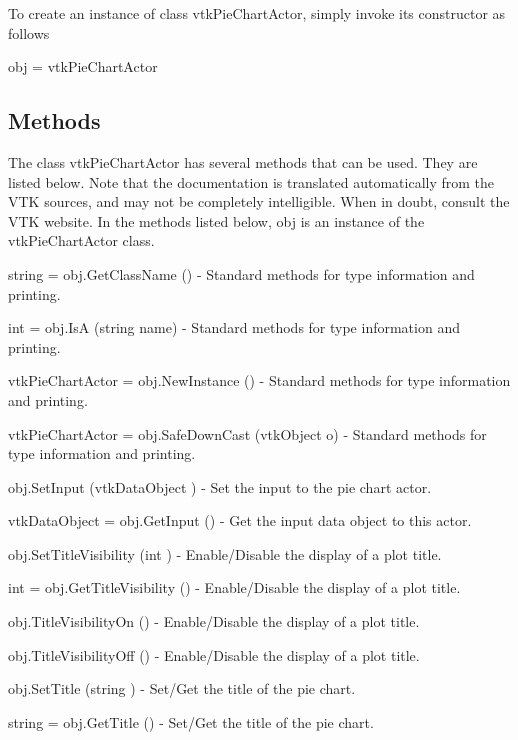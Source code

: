 To create an instance of class vtk\-Pie\-Chart\-Actor, simply invoke its constructor as follows \begin{DoxyVerb}  obj = vtkPieChartActor
\end{DoxyVerb}
 \hypertarget{vtkwidgets_vtkxyplotwidget_Methods}{}\subsection{Methods}\label{vtkwidgets_vtkxyplotwidget_Methods}
The class vtk\-Pie\-Chart\-Actor has several methods that can be used. They are listed below. Note that the documentation is translated automatically from the V\-T\-K sources, and may not be completely intelligible. When in doubt, consult the V\-T\-K website. In the methods listed below, {\ttfamily obj} is an instance of the vtk\-Pie\-Chart\-Actor class. 
\begin{DoxyItemize}
\item {\ttfamily string = obj.\-Get\-Class\-Name ()} -\/ Standard methods for type information and printing.  
\item {\ttfamily int = obj.\-Is\-A (string name)} -\/ Standard methods for type information and printing.  
\item {\ttfamily vtk\-Pie\-Chart\-Actor = obj.\-New\-Instance ()} -\/ Standard methods for type information and printing.  
\item {\ttfamily vtk\-Pie\-Chart\-Actor = obj.\-Safe\-Down\-Cast (vtk\-Object o)} -\/ Standard methods for type information and printing.  
\item {\ttfamily obj.\-Set\-Input (vtk\-Data\-Object )} -\/ Set the input to the pie chart actor.  
\item {\ttfamily vtk\-Data\-Object = obj.\-Get\-Input ()} -\/ Get the input data object to this actor.  
\item {\ttfamily obj.\-Set\-Title\-Visibility (int )} -\/ Enable/\-Disable the display of a plot title.  
\item {\ttfamily int = obj.\-Get\-Title\-Visibility ()} -\/ Enable/\-Disable the display of a plot title.  
\item {\ttfamily obj.\-Title\-Visibility\-On ()} -\/ Enable/\-Disable the display of a plot title.  
\item {\ttfamily obj.\-Title\-Visibility\-Off ()} -\/ Enable/\-Disable the display of a plot title.  
\item {\ttfamily obj.\-Set\-Title (string )} -\/ Set/\-Get the title of the pie chart.  
\item {\ttfamily string = obj.\-Get\-Title ()} -\/ Set/\-Get the title of the pie chart.  

\end{DoxyItemize}
